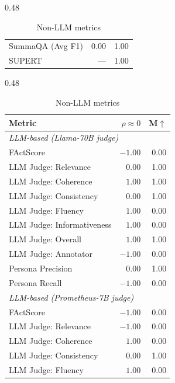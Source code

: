 \begin{table}[htbp]
\begin{subtable}[t]{0.48\textwidth}
\begin{tabular}{lrr}
\rowcolor{matchTrue} SummaQA (Avg F1)                      &   $0.00$ &  1.00 \\
\rowcolor{matchTrue} SUPERT                                &      --- &  1.00 \\
\bottomrule
\end{tabular}
\caption{Non-LLM metrics}
\end{subtable}
\hfill
\begin{subtable}[t]{0.48\textwidth}
\centering
\begin{tabular}{lrr}
\toprule
Metric & $\rho\approx0$ & M$\uparrow$ \\
\midrule
\multicolumn{3}{l}{\textit{LLM-based (Llama-70B judge)}} \\
\midrule
\rowcolor{matchFalse} FActScore                             &  $-1.00$ &  0.00 \\
\rowcolor{matchTrue} LLM Judge: Relevance                  &   $0.00$ &  1.00 \\
\rowcolor{matchFalse} LLM Judge: Coherence                  &   $1.00$ &  1.00 \\
\rowcolor{matchTrue} LLM Judge: Consistency                &   $0.00$ &  1.00 \\
\rowcolor{matchFalse} LLM Judge: Fluency                    &   $1.00$ &  0.00 \\
\rowcolor{matchFalse} LLM Judge: Informativeness            &   $1.00$ &  0.00 \\
\rowcolor{matchFalse} LLM Judge: Overall                    &   $1.00$ &  1.00 \\
\rowcolor{matchFalse} LLM Judge: Annotator        &  $-1.00$ &  0.00 \\
\rowcolor{matchTrue} Persona Precision                     &   $0.00$ &  1.00 \\
\rowcolor{matchFalse} Persona Recall                        &  $-1.00$ &  0.00 \\
\midrule
\multicolumn{3}{l}{\textit{LLM-based (Prometheus-7B judge)}} \\
\midrule
\rowcolor{matchFalse} FActScore                             &  $-1.00$ &  0.00 \\
\rowcolor{matchFalse} LLM Judge: Relevance                  &  $-1.00$ &  0.00 \\
\rowcolor{matchFalse} LLM Judge: Coherence                  &   $1.00$ &  0.00 \\
\rowcolor{matchTrue} LLM Judge: Consistency                &   $0.00$ &  1.00 \\
\rowcolor{matchFalse} LLM Judge: Fluency                    &   $1.00$ &  0.00 \\

\end{tabular}
\end{subtable}
\end{table}
